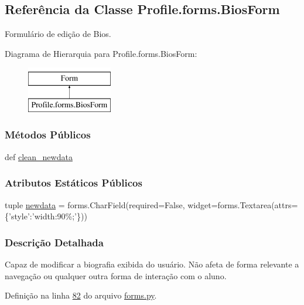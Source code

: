 \hypertarget{classProfile_1_1forms_1_1BiosForm}{\subsection{Referência da Classe Profile.\-forms.\-Bios\-Form}
\label{classProfile_1_1forms_1_1BiosForm}
}


Formulário de edição de Bios.  


Diagrama de Hierarquia para Profile.\-forms.\-Bios\-Form\-:\begin{figure}[H]
\begin{center}
\leavevmode
\includegraphics[height=2.000000cm]{d7/d1e/classProfile_1_1forms_1_1BiosForm}
\end{center}
\end{figure}
\subsubsection*{Métodos Públicos}
\begin{DoxyCompactItemize}
\item 
def \hyperlink{classProfile_1_1forms_1_1BiosForm_a10f21ed8d7cb888f0aa35618087c86af}{clean\-\_\-newdata}
\end{DoxyCompactItemize}
\subsubsection*{Atributos Estáticos Públicos}
\begin{DoxyCompactItemize}
\item 
tuple \hyperlink{classProfile_1_1forms_1_1BiosForm_a2862b20c24bac9aa5dc896925a2cb3d6}{newdata} = forms.\-Char\-Field(required=False, widget=forms.\-Textarea(attrs=\{'style'\-:'width\-:90\%;'\}))
\end{DoxyCompactItemize}


\subsubsection{Descrição Detalhada}
Capaz de modificar a biografia exibida do usuário. Não afeta de forma relevante a navegação ou qualquer outra forma de interação com o aluno. 

Definição na linha \hyperlink{Profile_2forms_8py_source_l00082}{82} do arquivo \hyperlink{Profile_2forms_8py_source}{forms.\-py}.



